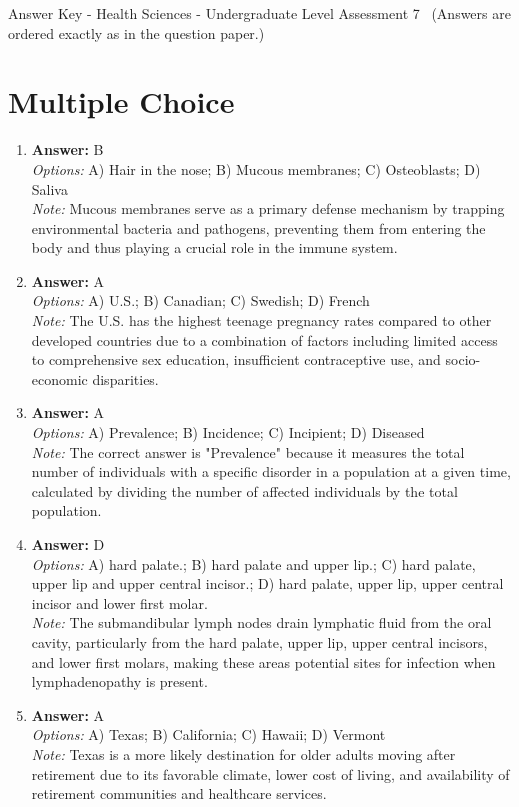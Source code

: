 \documentclass[12pt]{article}
\begin{document}
\begin{center}
Answer Key - Health Sciences - Undergraduate Level Assessment 7 \
\small (Answers are ordered exactly as in the question paper.)
\end{center}

\section*{Multiple Choice}
\begin{enumerate}[label=\arabic*.]
\item \textbf{Answer:} B
\\ \textit{Options:} A) Hair in the nose; B) Mucous membranes; C) Osteoblasts; D) Saliva
\\ \textit{Note:} Mucous membranes serve as a primary defense mechanism by trapping environmental bacteria and pathogens, preventing them from entering the body and thus playing a crucial role in the immune system.
\item \textbf{Answer:} A
\\ \textit{Options:} A) U.S.; B) Canadian; C) Swedish; D) French
\\ \textit{Note:} The U.S. has the highest teenage pregnancy rates compared to other developed countries due to a combination of factors including limited access to comprehensive sex education, insufficient contraceptive use, and socio-economic disparities.
\item \textbf{Answer:} A
\\ \textit{Options:} A) Prevalence; B) Incidence; C) Incipient; D) Diseased
\\ \textit{Note:} The correct answer is "Prevalence" because it measures the total number of individuals with a specific disorder in a population at a given time, calculated by dividing the number of affected individuals by the total population.
\item \textbf{Answer:} D
\\ \textit{Options:} A) hard palate.; B) hard palate and upper lip.; C) hard palate, upper lip and upper central incisor.; D) hard palate, upper lip, upper central incisor and lower first molar.
\\ \textit{Note:} The submandibular lymph nodes drain lymphatic fluid from the oral cavity, particularly from the hard palate, upper lip, upper central incisors, and lower first molars, making these areas potential sites for infection when lymphadenopathy is present.
\item \textbf{Answer:} A
\\ \textit{Options:} A) Texas; B) California; C) Hawaii; D) Vermont
\\ \textit{Note:} Texas is a more likely destination for older adults moving after retirement due to its favorable climate, lower cost of living, and availability of retirement communities and healthcare services.
\end{enumerate}
\end{document}
